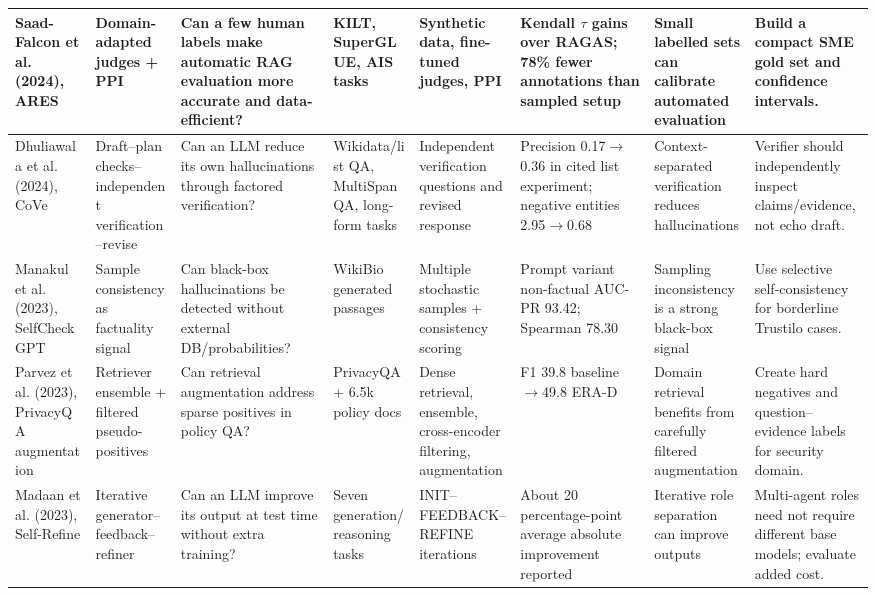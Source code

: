 \documentclass[11pt,journal,onecolumn]{IEEEtran}
\begin{document}
\begin{landscape}
\begin{longtable}{L{2.5cm}L{2.6cm}L{3.0cm}L{2.5cm}L{3.0cm}L{3.0cm}L{2.6cm}L{3.0cm}}
\midrule
Saad-Falcon et al. (2024), ARES & Domain-adapted judges + PPI & Can a few human labels make automatic RAG evaluation more accurate and data-efficient? & KILT, SuperGLUE, AIS tasks & Synthetic data, fine-tuned judges, PPI & Kendall $\tau$ gains over RAGAS; 78\% fewer annotations than sampled setup & Small labelled sets can calibrate automated evaluation & Build a compact SME gold set and confidence intervals. \\
\midrule
Dhuliawala et al. (2024), CoVe & Draft--plan checks--independent verification--revise & Can an LLM reduce its own hallucinations through factored verification? & Wikidata/list QA, MultiSpanQA, long-form tasks & Independent verification questions and revised response & Precision 0.17$\rightarrow$0.36 in cited list experiment; negative entities 2.95$\rightarrow$0.68 & Context-separated verification reduces hallucinations & Verifier should independently inspect claims/evidence, not echo draft. \\
\midrule
Manakul et al. (2023), SelfCheckGPT & Sample consistency as factuality signal & Can black-box hallucinations be detected without external DB/probabilities? & WikiBio generated passages & Multiple stochastic samples + consistency scoring & Prompt variant non-factual AUC-PR 93.42; Spearman 78.30 & Sampling inconsistency is a strong black-box signal & Use selective self-consistency for borderline Trustilo cases. \\
\midrule
Parvez et al. (2023), PrivacyQA augmentation & Retriever ensemble + filtered pseudo-positives & Can retrieval augmentation address sparse positives in policy QA? & PrivacyQA + 6.5k policy docs & Dense retrieval, ensemble, cross-encoder filtering, augmentation & F1 39.8 baseline $\rightarrow$49.8 ERA-D & Domain retrieval benefits from carefully filtered augmentation & Create hard negatives and question--evidence labels for security domain. \\
\midrule
Madaan et al. (2023), Self-Refine & Iterative generator--feedback--refiner & Can an LLM improve its output at test time without extra training? & Seven generation/reasoning tasks & INIT--FEEDBACK--REFINE iterations & About 20 percentage-point average absolute improvement reported & Iterative role separation can improve outputs & Multi-agent roles need not require different base models; evaluate added cost. \\
\bottomrule
\end{longtable}
\end{landscape}
\end{document}
